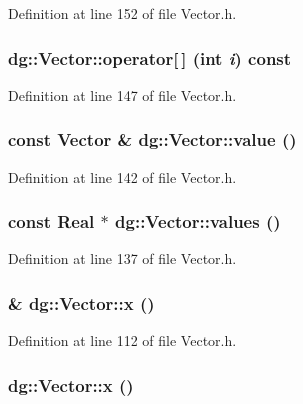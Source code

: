 Definition at line 152 of file Vector.h.
\subsubsection{ dg::Vector::operator[$\,$] (int {\em i}) const\hspace{0.3cm}{\tt  [inline]}}\label{classdg_1_1Vector_a12}




Definition at line 147 of file Vector.h.
\subsubsection{\setlength{\rightskip}{0pt plus 5cm}const Vector \& dg::Vector::value ()\hspace{0.3cm}{\tt  [inline]}}\label{classdg_1_1Vector_a11}




Definition at line 142 of file Vector.h.
\subsubsection{\setlength{\rightskip}{0pt plus 5cm}const {\bf Real} $\ast$ dg::Vector::values ()\hspace{0.3cm}{\tt  [inline]}}\label{classdg_1_1Vector_a10}




Definition at line 137 of file Vector.h.
\subsubsection{ \& dg::Vector::x ()\hspace{0.3cm}{\tt  [inline]}}\label{classdg_1_1Vector_a5}




Definition at line 112 of file Vector.h.
\subsubsection{ dg::Vector::x ()\hspace{0.3cm}{\tt  [inline]}}\label{classdg_1_1Vector_a2}




